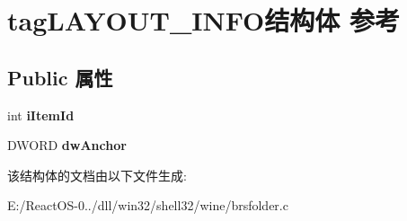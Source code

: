 \hypertarget{structtag_l_a_y_o_u_t___i_n_f_o}{}\section{tag\+L\+A\+Y\+O\+U\+T\+\_\+\+I\+N\+F\+O结构体 参考}
\label{structtag_l_a_y_o_u_t___i_n_f_o}
\subsection*{Public 属性}
\begin{DoxyCompactItemize}
\item 
\mbox{\label{structtag_l_a_y_o_u_t___i_n_f_o_aa9753baed055a45556c0ec76274d0078}} 
int {\bfseries i\+Item\+Id}
\item 
\mbox{\label{structtag_l_a_y_o_u_t___i_n_f_o_a0d21c2de50c0e4faa8558ba650a04d43}} 
D\+W\+O\+RD {\bfseries dw\+Anchor}
\end{DoxyCompactItemize}


该结构体的文档由以下文件生成\+:\begin{DoxyCompactItemize}
\item 
E\+:/\+React\+O\+S-\/0../dll/win32/shell32/wine/brsfolder.\+c\end{DoxyCompactItemize}
